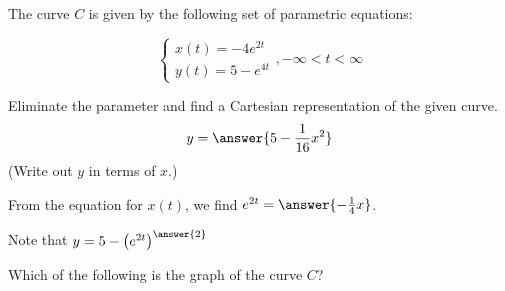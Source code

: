 \documentclass{ximera}
\author{Jim Talamo}
\begin{document}
\begin{exercise}

The curve $C$ is given by the following set of parametric equations:

\[ \begin{cases}
x(t)=   -4e^{2t} \\
y(t)=   5 - e^{4t}
\end{cases}
, -\infty < t < \infty \]

Eliminate the parameter and find a Cartesian representation of the given curve.
\[
y= \answer{ 5 -\frac{1}{16}x^2}
\]
(Write out $y$ in terms of $x$.)

\begin{hint}
From the equation for $x(t)$, we find $e^{2t} = \answer{-\frac{1}{4}x}$.  

\begin{question}
Note that $y=5-\left(e^{2t}\right)^{\answer{2}}$
\end{question}
\end{hint}

\begin{exercise}
Which of the following is the graph of the curve $C$?
\end{exercise}


\end{exercise}
\end{document}
